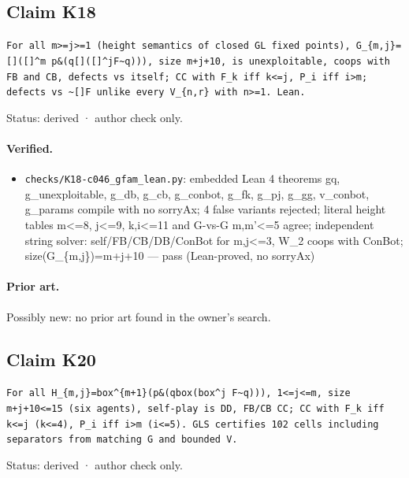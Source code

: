 \documentclass{article}
\begin{document}
\subsection*{Claim K18}

\texttt{For all m\textgreater{}=j\textgreater{}=1 (height semantics of closed GL fixed points), G\_\{m,j\}=[]([]\textasciicircum{}m p\&(q\textbar{}[]([]\textasciicircum{}jF\textbar{}\textasciitilde{}q))), size m+j+10, is unexploitable, coops with FB and CB, defects vs itself; CC with F\_k iff k\textless{}=j, P\_i iff i\textgreater{}m; defects vs \textasciitilde{}[]F unlike every V\_\{n,r\} with n\textgreater{}=1. Lean.}

Status: derived · author check only.

\paragraph{Verified.}
\begin{itemize}
\item \texttt{checks/K18-c046\_gfam\_lean.py}: embedded Lean 4 theorems gq, g\_unexploitable, g\_db, g\_cb, g\_conbot, g\_fk, g\_pj, g\_gg, v\_conbot, g\_params compile with no sorryAx; 4 false variants rejected; literal height tables m\textless{}=8, j\textless{}=9, k,i\textless{}=11 and G-vs-G m,m'\textless{}=5 agree; independent string solver: self/FB/CB/DB/ConBot for m,j\textless{}=3, W\_2 coops with ConBot; size(G\_\{m,j\})=m+j+10 --- pass (Lean-proved, no sorryAx)
\end{itemize}

\paragraph{Prior art.} Possibly new: no prior art found in the owner's search.

\subsection*{Claim K20}

\texttt{For all H\_\{m,j\}=box\textasciicircum{}\{m+1\}(p\&(q\textbar{}box(box\textasciicircum{}j F\textbar{}\textasciitilde{}q))), 1\textless{}=j\textless{}=m, size m+j+10\textless{}=15 (six agents), self-play is DD, FB/CB CC; CC with F\_k iff k\textless{}=j (k\textless{}=4), P\_i iff i\textgreater{}m (i\textless{}=5). GLS certifies 102 cells including separators from matching G and bounded V.}

Status: derived · author check only.
\end{document}
